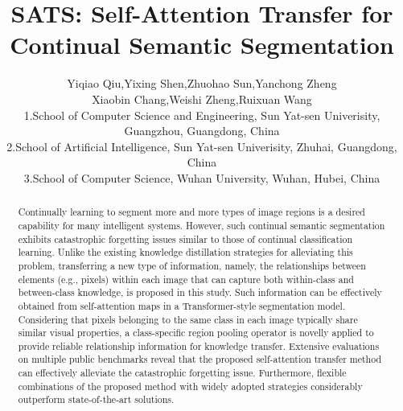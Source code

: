 \documentclass[onecolumn,conference,compsoc]{IEEEtran}
\begin{document}
\title{SATS: Self-Attention Transfer for Continual Semantic Segmentation}



\author{
Yiqiao Qiu,Yixing Shen,Zhuohao Sun,Yanchong Zheng\\
Xiaobin Chang,Weishi Zheng,Ruixuan Wang\textsuperscript{\Envelope}\\
\small{1.School of Computer Science and Engineering, Sun Yat-sen Univerisity, Guangzhou, Guangdong, China}\\
\small{2.School of Artificial Intelligence, Sun Yat-sen Univerisity, Zhuhai, Guangdong, China}\\
\small{3.School of Computer Science, Wuhan University, Wuhan, Hubei, China}
}

\maketitle



\pagestyle{plain}
\thispagestyle{plain}






\begin{abstract}
Continually learning to segment more and more types of image regions is a desired capability for many intelligent systems. However, such continual semantic segmentation 
{exhibits} catastrophic {forgetting issues similar to those of} continual classification learning. {Unlike the} existing knowledge distillation strategies {for alleviating this problem, transferring} a new type of information, {namely}, the relationships between elements (e.g., pixels) within each image {that} can capture both within-class and between-class knowledge, {is proposed in this study}. Such information can be effectively obtained from self-attention maps in a {Transformer-style} segmentation model. Considering that pixels belonging to the same class in each image {typically} share similar visual properties, a class-specific region pooling operator is novelly applied to provide reliable relationship information for knowledge transfer. Extensive evaluations on multiple public benchmarks reveal that the proposed self-attention transfer method can effectively alleviate the catastrophic forgetting issue. {Furthermore, flexible combinations of the proposed method} with widely adopted strategies {considerably} outperform state-of-the-art solutions.
\end{abstract}
\end{document}
